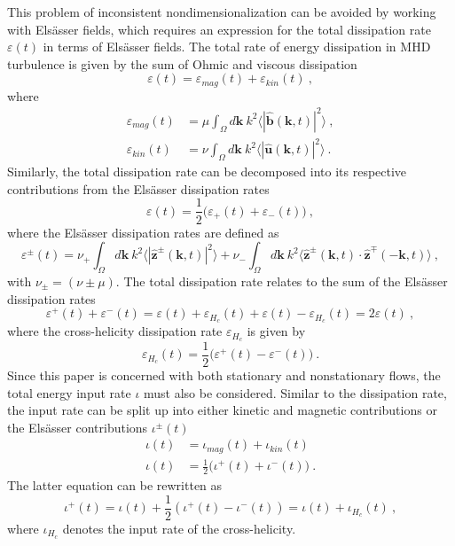 \documentclass[aps,pre,onecolumn,superscriptaddress,notitlepage]{revtex4-1}
\newcommand{\vep}{\varepsilon}
\renewcommand{\vec}[1]{\bm{#1}}
\newcommand{\fvec}[1]{\hat{\bm{#1}}}
\newcommand{\vk}{\vec{k}}
\newcommand{\blue}[1]{{#1}}
\newcommand{\beq}{\begin{equation}}
\newcommand{\eeq}{\end{equation}}
\begin{document}
This problem of inconsistent nondimensionalization can be avoided by working with Els\"asser 
fields, which requires an expression for the total dissipation rate $\vep(t)$ 
in terms of Els\"asser fields. 
The total rate of energy dissipation in MHD turbulence is given by
the sum of Ohmic and viscous dissipation 
\beq
\varepsilon(t) = \varepsilon_{mag}(t) + \varepsilon_{kin}(t) \ ,
\eeq
where 
\begin{align}
\vep_{mag}(t) & = \mu \int_\Omega d\vec{k} \ k^2 \langle |\fvec{b}(\vk,t) |^2 \rangle \ , \\
\vep_{kin}(t) &=  \nu \int_\Omega d\vec{k} \ k^2 \langle |\fvec{u}(\vk,t) |^2 \rangle \ .
\end{align}
Similarly, the total dissipation rate can be decomposed into its respective 
contributions from the Els\"asser dissipation rates
\beq
\varepsilon(t) = \frac{1}{2} \big (\varepsilon_{+}(t) + \varepsilon_{-}(t) \big ) \ ,
\eeq
where the Els\"{a}sser dissipation rates are defined as 
\beq 
\vep^\pm(t) = \nu_+ \int_\Omega d\vec{k}  \ k^2 \langle |\fvec{z}^\pm(\vk,t) |^2 \rangle 
            + \nu_- \int_\Omega d\vec{k}  \ k^2 \langle \fvec{z}^\pm(\vk,t) \cdot \fvec{z}^\mp(-\vk,t) \rangle 
\ , 
\eeq
with $\nu_\pm = (\nu \pm \mu)$. 
The total dissipation rate relates to the sum of the Els\"{a}sser
dissipation rates 
\beq
\vep^+(t) + \vep^-(t) = \vep(t) +\vep_{H_{c}}(t) + \vep(t) -\vep_{H_{c}}(t) = 2 \vep(t) \ ,
\eeq
where 
the cross-helicity dissipation rate $\vep_{H_{c}}$ is given by 
\beq
\vep_{H_{c}}(t) = \frac{1}{2} \big(\vep^+(t) - \vep^-(t)\big) \ .
\eeq
Since this paper is concerned with \blue{both stationary and} nonstationary 
flows, the total energy input rate 
$\iota$ must also be considered. Similar to the dissipation rate, the input rate can be split up 
into either kinetic and magnetic contributions or the Els\"asser contributions $\iota^\pm(t)$ 
\begin{align}
\label{eq:diss_ub}
\iota(t) &= \iota_{mag}(t) + \iota_{kin}(t) \\
\label{eq:diss_zz}
\iota(t)&=\frac{1}{2}\big(\iota^+(t) + \iota^-(t) \big) \ .
\end{align}
The latter equation can be rewritten as
\beq
\iota^+(t) = \iota(t) + \frac{1}{2}\left( \iota^+(t) - \iota^-(t) \right) = \iota(t) + \iota_{H_c}(t) \ ,
\eeq
where $\iota_{H_c}$ denotes the input rate of the cross-helicity.
\end{document}
